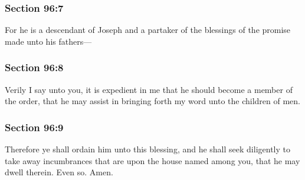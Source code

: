 
	\subsubsection{Section 96:7} %
		\label{DC96-7}

		For he is a descendant of Joseph and a partaker of the blessings of the promise made unto his fathers—


	\subsubsection{Section 96:8} %
		\label{DC96-8}

		Verily I say unto you, it is expedient in me that he should become a member of the order, that he may assist in bringing forth my word unto the children of men.


	\subsubsection{Section 96:9} %
		\label{DC96-9}

		Therefore ye shall ordain him unto this blessing, and he shall seek diligently to take away incumbrances that are upon the house named among you, that he may dwell therein.  Even so.  Amen.

